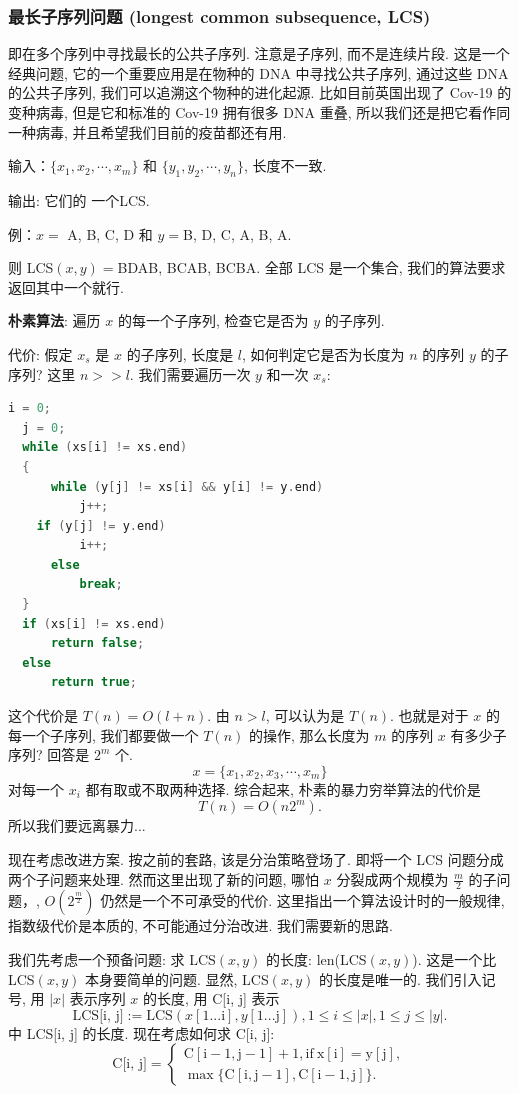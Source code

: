 \documentclass[a4paper]{ctexart}
\theoremstyle{definition}
\theoremstyle{definition}
\begin{document}
\subsubsection{最长子序列问题 (longest common subsequence, LCS)}

即在多个序列中寻找最长的公共子序列. 注意是子序列, 而不是连续片段. 这是一个经典问题, 
它的一个重要应用是在物种的 DNA 中寻找公共子序列, 通过这些 DNA 的公共子序列, 
我们可以追溯这个物种的进化起源. 比如目前英国出现了 Cov-19 的变种病毒, 
但是它和标准的 Cov-19 拥有很多 DNA 重叠, 所以我们还是把它看作同一种病毒, 
并且希望我们目前的疫苗都还有用.

输入：$\{x_1, x_2, \cdots, x_m\}$ 和 $\{y_1, y_2, \cdots, y_n\}$, 长度不一致. 

输出: 它们的 一个LCS.

例：$x =$ A, B, C, D 和 $y =$B, D, C, A, B, A.

则 LCS$(x, y) = $BDAB, BCAB, BCBA. 全部 LCS 是一个集合, 我们的算法要求返回其中一个就行.

\textbf{朴素算法}: 遍历 $x$ 的每一个子序列, 检查它是否为 $y$ 的子序列.

代价: 假定 $x_s$ 是 $x$ 的子序列, 长度是 $l$, 如何判定它是否为长度为 $n$ 的序列 $y$ 的子序列? 
这里 $n >> l$. 我们需要遍历一次 $y$ 和一次 $x_s$:

\begin{lstlisting}[language=c++]
  i = 0;
  j = 0;
  while (xs[i] != xs.end)
  {
      while (y[j] != xs[i] && y[i] != y.end)
          j++;
    if (y[j] != y.end)
          i++;
      else
          break;
  }
  if (xs[i] != xs.end)
      return false;
  else
      return true;    
\end{lstlisting}

这个代价是 $T(n) = O(l + n)$. 由 $n > l$, 可以认为是 $T(n)$. 
也就是对于 $x$ 的每一个子序列, 我们都要做一个 $T(n)$ 的操作, 那么长度为 $m$ 的序列 $x$ 有多少子序列? 
回答是 $2^m$ 个.
$$
x = \{x_1, x_2, x_3, \cdots, x_m \}
$$
对每一个 $x_i$ 都有取或不取两种选择. 综合起来, 朴素的暴力穷举算法的代价是
$$
T(n) = O(n 2^m).
$$
所以我们要远离暴力...

现在考虑改进方案. 按之前的套路, 该是分治策略登场了. 
即将一个 LCS 问题分成两个子问题来处理. 然而这里出现了新的问题, 
哪怕 $x$ 分裂成两个规模为 $\frac{m}{2}$ 的子问题，, 
$O(2^{\frac{m}{2}})$ 仍然是一个不可承受的代价. 
这里指出一个算法设计时的一般规律, 指数级代价是本质的, 不可能通过分治改进. 
我们需要新的思路.

我们先考虑一个预备问题: 求 LCS$(x, y)$ 的长度: len(LCS$(x, y)$). 
这是一个比 LCS$(x, y)$ 本身要简单的问题. 显然, LCS$(x, y)$ 的长度是唯一的. 
我们引入记号, 用 $|x|$ 表示序列 $x$ 的长度, 用 C[i, j] 表示
$$
\mbox{LCS[i, j]} := \mbox{LCS}(x[1...\mathrm{i}], y[1...\mathrm{j}]), 
1 \leq i \leq |x|, 1 \leq j \leq |y|.
$$
中 LCS[i, j] 的长度. 现在考虑如何求 C[i, j]:
$$
\mbox{C[i, j]} = \left\{
\begin{array}{ll}
\mathrm{C[i - 1, j - 1] + 1}, \mathrm{if~x[i] = y[j]},\\
\max\{\mathrm{C[i, j - 1], C[i - 1, j]}\}.
\end{array}
\right.
$$
\end{document}
